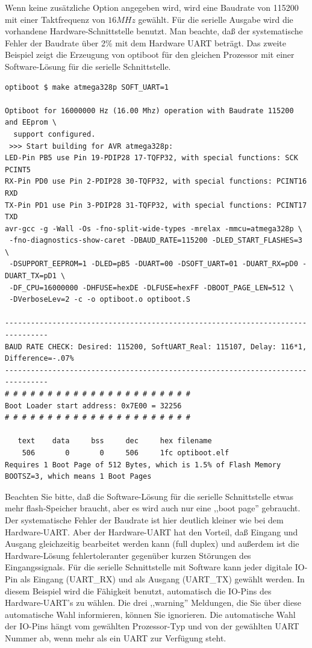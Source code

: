 Wenn keine zusätzliche Option angegeben wird, wird eine Baudrate von 115200 mit einer Taktfrequenz von \(16 MHz\) gewählt.
Für die serielle Ausgabe wird die vorhandene Hardware-Schnittstelle benutzt. 
Man beachte, daß der systematische Fehler der Baudrate über 2\% mit dem Hardware UART beträgt.
Das zweite Beispiel zeigt die Erzeugung von optiboot für den gleichen Prozessor mit einer Software-Lösung
für die serielle Schnittstelle.

\begin{verbatim}
optiboot $ make atmega328p SOFT_UART=1

Optiboot for 16000000 Hz (16.00 Mhz) operation with Baudrate 115200 and EEprom \
  support configured.
 >>> Start building for AVR atmega328p:
LED-Pin PB5 use Pin 19-PDIP28 17-TQFP32, with special functions: SCK PCINT5
RX-Pin PD0 use Pin 2-PDIP28 30-TQFP32, with special functions: PCINT16 RXD
TX-Pin PD1 use Pin 3-PDIP28 31-TQFP32, with special functions: PCINT17 TXD
avr-gcc -g -Wall -Os -fno-split-wide-types -mrelax -mmcu=atmega328p \
 -fno-diagnostics-show-caret -DBAUD_RATE=115200 -DLED_START_FLASHES=3 \
 -DSUPPORT_EEPROM=1 -DLED=pB5 -DUART=00 -DSOFT_UART=01 -DUART_RX=pD0 -DUART_TX=pD1 \
 -DF_CPU=16000000 -DHFUSE=hexDE -DLFUSE=hexFF -DBOOT_PAGE_LEN=512 \
 -DVerboseLev=2 -c -o optiboot.o optiboot.S

--------------------------------------------------------------------------------
BAUD RATE CHECK: Desired: 115200, SoftUART_Real: 115107, Delay: 116*1, Difference=-.07%
--------------------------------------------------------------------------------
# # # # # # # # # # # # # # # # # # # # # #
Boot Loader start address: 0x7E00 = 32256
# # # # # # # # # # # # # # # # # # # # # #

   text	   data	    bss	    dec	    hex	filename
    506	      0	      0	    506	    1fc	optiboot.elf
Requires 1 Boot Page of 512 Bytes, which is 1.5% of Flash Memory
BOOTSZ=3, which means 1 Boot Pages

\end{verbatim}

Beachten Sie bitte, daß die Software-Lösung für die serielle Schnittstelle etwas mehr flash-Speicher braucht,
aber es wird auch nur eine ,,boot page'' gebraucht. Der systematische Fehler der Baudrate ist hier deutlich kleiner
wie bei dem Hardware-UART.
Aber der Hardware-UART hat den Vorteil, daß Eingang und Ausgang gleichzeitig bearbeitet werden kann (full duplex) und 
außerdem ist die Hardware-Lösung fehlertoleranter gegenüber kurzen Störungen des Eingangssignals.
Für die serielle Schnittstelle mit Software kann jeder digitale IO-Pin als Eingang (UART\_RX) und als Ausgang (UART\_TX)
gewählt werden. In diesem Beispiel wird die Fähigkeit benutzt, automatisch die IO-Pins des Hardware-UART's zu wählen.
Die drei ,,warning'' Meldungen, die Sie über diese automatische Wahl informieren, können Sie ignorieren.
Die automatische Wahl der IO-Pins hängt vom gewählten Prozessor-Typ und von der gewählten UART Nummer ab,
wenn mehr als ein UART zur Verfügung steht.

